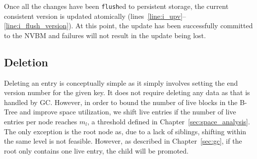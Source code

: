 
Once all the changes have been \texttt{flush}ed to persistent storage,
the current consistent version is updated atomically
(lines~\ref{line:i_upv}--\ref{line:i_flush_version}).  At this point,
the update has been successfully committed to the NVBM and failures
will not result in the update being lost.


\subsection{Deletion}
\label{sec:btree_delete}



Deleting an entry is conceptually simple as it simply involves setting
the end version number for the given key.  It does not require
deleting any data as that is handled by GC\@.  However, in order to
bound the number of live blocks in the B-Tree and improve space
utilization, we shift live entries if the number of live entries per
node reaches $m_{l}$, a threshold defined in
Chapter~\ref{sec:space_analysis}.  The only exception is the root node
as, due to a lack of siblings, shifting within the same level is not
feasible.  However, as described in Chapter~\ref{sec:gc}, if the root
only contains one live entry, the child will be promoted.

